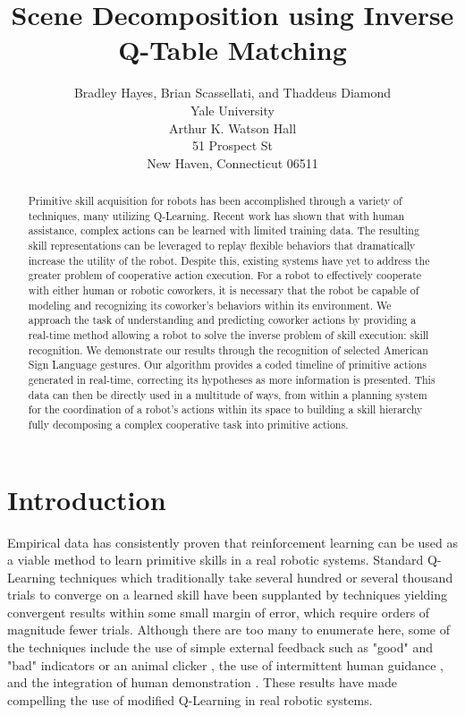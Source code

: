 \documentclass[letterpaper]{article}
\begin{document}
\title{Scene Decomposition using Inverse Q-Table Matching}
\author{Bradley Hayes, Brian Scassellati, and Thaddeus Diamond\\
Yale University\\
Arthur K. Watson Hall\\
51 Prospect St\\
New Haven, Connecticut 06511\\
}

\maketitle

\begin{abstract}
Primitive skill acquisition for robots has been accomplished through a variety
of techniques, many utilizing Q-Learning. Recent work has shown that with human
assistance, complex actions can be learned with limited training data. The
resulting skill representations can be leveraged to replay flexible behaviors
that dramatically increase the utility of the robot. Despite this, existing
systems have yet to address the greater problem of cooperative action execution.
For a robot to effectively cooperate with either human or robotic coworkers,
it is necessary that the robot be capable of modeling and recognizing its
coworker’s behaviors within its environment. We approach the task of
understanding and predicting coworker actions by providing a real-time method
allowing a robot to solve the inverse problem of skill execution: skill
recognition. We demonstrate our results through the recognition of selected
American Sign Language gestures. Our algorithm provides a coded timeline of
primitive actions generated in real-time, correcting its hypotheses as more
information is presented. This data can then be directly used in a multitude
of ways, from within a planning system for the coordination of a robot's
actions within its space to building a skill hierarchy fully
decomposing a complex cooperative task into primitive actions.
\end{abstract}

\section{Introduction}
\label{sec:intro}
Empirical data has consistently proven that reinforcement learning can be used
as a viable method to learn primitive skills in a real robotic systems.
Standard Q-Learning techniques which traditionally take several hundred or
several thousand trials to converge on a learned skill have been supplanted
by techniques yielding convergent results within some small margin of error,
which require orders of magnitude fewer trials.   Although there are too many
to enumerate here, some of the techniques include the use of simple external
feedback such as "good" and "bad" indicators \cite{TAMER} or an animal
clicker \cite{Clicker}, the use of intermittent human
guidance \cite{AdviceTaking,TeacherRL}, and the integration of human
demonstration \cite{DemonstrationRL}.  These results
have made compelling the use of modified Q-Learning in real robotic systems.
\end{document}
